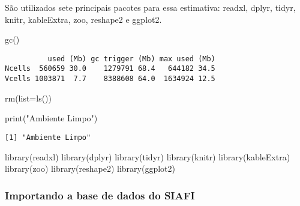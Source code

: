 \documentclass[
  letterpaper,
  DIV=11,
  numbers=noendperiod]{scrartcl}
\newenvironment{Shaded}{\begin{snugshade}}{\end{snugshade}}
\newcommand{\AttributeTok}[1]{\textcolor[rgb]{0.40,0.45,0.13}{#1}}
\newcommand{\FunctionTok}[1]{\textcolor[rgb]{0.28,0.35,0.67}{#1}}
\newcommand{\NormalTok}[1]{\textcolor[rgb]{0.00,0.23,0.31}{#1}}
\newcommand{\StringTok}[1]{\textcolor[rgb]{0.13,0.47,0.30}{#1}}
\begin{document}
São utilizados sete principais pacotes para essa estimativa: readxl,
dplyr, tidyr, knitr, kableExtra, zoo, reshape2 e ggplot2.

\begin{Shaded}
\begin{Highlighting}[]
\FunctionTok{gc}\NormalTok{()}
\end{Highlighting}
\end{Shaded}

\begin{verbatim}
          used (Mb) gc trigger (Mb) max used (Mb)
Ncells  560659 30.0    1279791 68.4   644182 34.5
Vcells 1003871  7.7    8388608 64.0  1634924 12.5
\end{verbatim}

\begin{Shaded}
\begin{Highlighting}[]
\FunctionTok{rm}\NormalTok{(}\AttributeTok{list=}\FunctionTok{ls}\NormalTok{())}

\FunctionTok{print}\NormalTok{(}\StringTok{"Ambiente Limpo"}\NormalTok{)}
\end{Highlighting}
\end{Shaded}

\begin{verbatim}
[1] "Ambiente Limpo"
\end{verbatim}

\begin{Shaded}
\begin{Highlighting}[]
\FunctionTok{library}\NormalTok{(readxl)}
\FunctionTok{library}\NormalTok{(dplyr)}
\FunctionTok{library}\NormalTok{(tidyr)}
\FunctionTok{library}\NormalTok{(knitr)}
\FunctionTok{library}\NormalTok{(kableExtra)}
\FunctionTok{library}\NormalTok{(zoo)}
\FunctionTok{library}\NormalTok{(reshape2)}
\FunctionTok{library}\NormalTok{(ggplot2)}
\end{Highlighting}
\end{Shaded}

\hypertarget{importando-a-base-de-dados-do-siafi}{%
\subsubsection{Importando a base de dados do
SIAFI}\label{importando-a-base-de-dados-do-siafi}}
\end{document}
